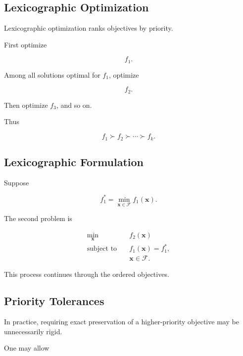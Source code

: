 \subsection{Lexicographic Optimization}
\label{subsec:lexicographic-optimization}

Lexicographic optimization ranks objectives by priority.

First optimize

\[
f_1.
\]

Among all solutions optimal for \(f_1\), optimize

\[
f_2.
\]

Then optimize \(f_3\), and so on.

Thus

\[
\boxed{
f_1
\succ
f_2
\succ
\cdots
\succ
f_k.
}
\]

\subsection{Lexicographic Formulation}
\label{subsec:lexicographic-formulation}

Suppose

\[
f_1^*
=
\min_{\mathbf{x}\in\mathcal{F}}
f_1(\mathbf{x}).
\]

The second problem is

\[
\boxed{
\begin{aligned}
\min_{\mathbf{x}}
\quad&
f_2(\mathbf{x})
\\
\text{subject to}
\quad&
f_1(\mathbf{x})
=
f_1^*,
\\
&
\mathbf{x}\in\mathcal{F}.
\end{aligned}
}
\]

This process continues through the ordered objectives.

\subsection{Priority Tolerances}
\label{subsec:lexicographic-tolerances}

In practice, requiring exact preservation of a higher-priority objective
may be unnecessarily rigid.

One may allow

